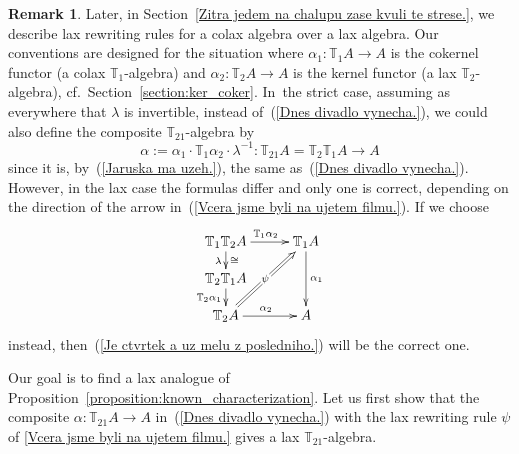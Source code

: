 \documentclass[12pt,leqno]{amsart}
\theoremstyle{definition}
\newtheorem{remark}[theorem]{Remark}
\def\T{\mathbb{T}}
\newcommand{\4}{\texttt{4}}
\begin{document}
\begin{remark}
Later, in Section~\ref{Zitra jedem na chalupu zase kvuli te strese.}, 
we describe lax rewriting rules for a colax algebra over a lax
algebra. Our conventions are designed for the situation where
$\alpha_1 : \T_1 A \to A$ is the cokernel functor (a colax
$\T_1$-algebra) and $\alpha_2 : \T_2 A \to A$ is the kernel functor
(a lax $\T_2$-algebra), cf.~Section~\ref{section:ker_coker}. In~the
strict case, assuming as everywhere that $\lambda$ is invertible, instead of~(\ref{Dnes divadlo vynecha.}), we could also
define the composite $\T_{21}$-algebra by
\begin{equation}
\label{Je ctvrtek a uz melu z posledniho.}
\alpha := \alpha_1 \cdot \T_1  \alpha_2 \cdot \lambda^{-1} : 
 \T_{21}A = \T_2 \T_1 A
\longrightarrow A
\end{equation}
since it is, by~(\ref{Jaruska ma uzeh.}), the same
as~(\ref{Dnes divadlo vynecha.}). However, in the lax case the formulas differ
and only one is correct, depending on the direction
of the arrow in~(\ref{Vcera jsme byli na ujetem filmu.}). If we choose
\[
\xymatrix@C=2.7em@R=1.2em{
\T_1\T_2 A \ar[r]^{\T_1\alpha_2} \ar[d]_\lambda^\cong    
& \T_1 A \ar[dd]^{\alpha_1}   \ar@{<=}[ddl]|{\psi\rule{.1em}{0pt}}
\\
\T_2 \T_1 A
\ar[d]_{\T_2\alpha_1} 
\\
\T_2A   \ar[r]^{\alpha_2}    &A 
}
\]
instead, then~(\ref{Je ctvrtek a uz melu z posledniho.}) will be the
correct one. 
  
\end{remark}
Our goal is to find a lax analogue of 
Proposition~\ref{proposition:known_characterization}. 
Let us first show that the composite
\hbox{$\alpha \colon \T_{21}A \to A$} in~(\ref{Dnes divadlo vynecha.}) with the lax rewriting rule $\psi$ of \eqref{Vcera jsme byli na ujetem filmu.} gives a lax
$\T_{21}$-algebra. 
\end{document}
